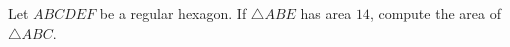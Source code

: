 Let $ABCDEF$ be a regular hexagon. If $\triangle{ABE}$ has area $14$, compute the area of $\triangle{ABC}$.